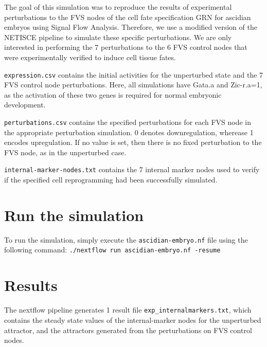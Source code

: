\documentclass[
]{book}
\begin{document}
The goal of this simulation was to reproduce the results of experimental perturbations to the FVS nodes of the cell fate specification GRN for ascidian embryos using Signal Flow Analysis. Therefore, we use a modified version of the NETISCE pipeline to simulate these specific perturbations.
We are only interested in performing the 7 perturbations to the 6 FVS control nodes that were experimentally verified to induce cell tissue fates.

\texttt{expression.csv} contains the initial activities for the unperturbed state and the 7 FVS control node perturbations. Here, all simulations have Gata.a and Zic-r.a=1, as the activation of these two genes is required for normal embryonic development.

\texttt{perturbations.csv} contains the specified perturbations for each FVS node in the appropriate perturbation simulation. 0 denotes downregulation, wherease 1 encodes upregulation. If no value is set, then there is no fixed perturbation to the FVS node, as in the unperturbed case.

\texttt{internal-marker-nodes.txt} contains the 7 internal marker nodes used to verify if the specified cell reprogramming had been successfully simulated.

\hypertarget{run-the-simulation}{%
\section{Run the simulation}\label{run-the-simulation}}

To run the simulation, simply execute the \texttt{ascidian-embryo.nf} file using the following command: \texttt{./nextflow\ run\ ascidian-embryo.nf\ -resume}

\hypertarget{results}{%
\section{Results}\label{results}}

The nextflow pipeline generates 1 result file \texttt{exp\_internalmarkers.txt}, which contains the steady state values of the internal-marker nodes for the unperturbed attractor, and the attractors generated from the perturbations on FVS control nodes.
\end{document}
